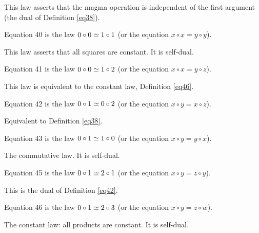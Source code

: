 This law asserts that the magma operation is independent of the first argument (the dual of Definition \ref{eq38}).

\begin{definition}[Equation 40]\label{eq40}\leanok{}  Equation 40 is the law $0 \circ 0  \simeq  1 \circ 1$ (or the equation $x \circ x = y \circ y$).
\end{definition}

This law asserts that all squares are constant. It is self-dual.

\begin{definition}[Equation 41]\label{eq41}\leanok{}  Equation 41 is the law $0 \circ 0  \simeq  1 \circ 2$ (or the equation $x \circ x = y \circ z$).
\end{definition}

This law is equivalent to the constant law, Definition \ref{eq46}.

\begin{definition}[Equation 42]\label{eq42}\leanok{}  Equation 42 is the law $0 \circ 1  \simeq  0 \circ 2$ (or the equation $x \circ y = x \circ z$).
\end{definition}

Equivalent to Definition \ref{eq38}.

\begin{definition}[Equation 43]\label{eq43}\leanok{}  Equation 43 is the law $0 \circ 1  \simeq  1 \circ 0$ (or the equation $x \circ y = y \circ x$).
\end{definition}

The commutative law. It is self-dual.

\begin{definition}[Equation 45]\label{eq45}\leanok{}  Equation 45 is the law $0 \circ 1  \simeq  2 \circ 1$ (or the equation $x \circ y = z \circ y$).
\end{definition}

This is the dual of Definition \ref{eq42}.

\begin{definition}[Equation 46]\label{eq46}\leanok{}  Equation 46 is the law $0 \circ 1  \simeq  2 \circ 3$ (or the equation $x \circ y = z \circ w$).
\end{definition}

The constant law: all products are constant. It is self-dual.

